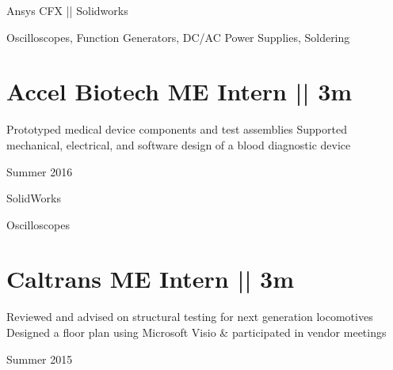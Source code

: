 \vspace{-1.5ex}
{
\vspace{1.8ex}
\color{cyan}\small
{Ansys CFX || Solidworks} %
}

{
\vspace{-2.5ex}\hspace{1.5in}
\color{cyan}\small
{Oscilloscopes, Function Generators, DC/AC Power Supplies, Soldering} %
}

\vspace{3.5ex}
\section
{\textbf{Accel Biotech}
\newline
ME Intern || 3m}

\BulletItem
\vspace{-2.5ex}
\begin{detail}
\BulletItem
Prototyped medical device components and test assemblies
\BulletItem
Supported mechanical, electrical, and software design of a blood diagnostic device
\end{detail}

\begin{subtitle}
\vspace{-7.8ex}
{{Summer 2016}}
\end{subtitle}
\vspace{0ex}

{
\vspace{0.5ex}
\color{cyan}\small
{SolidWorks} %
}

{
\vspace{-2.5ex}\hspace{1.5in}
\color{cyan}\small
{Oscilloscopes} %
}

\vspace{3.5ex}
\section
{\textbf{Caltrans}
\newline
ME Intern || 3m
\newline
}

\BulletItem
\vspace{-2.5ex}
\begin{detail}
\BulletItem
Reviewed and advised on structural testing for next generation locomotives
\BulletItem
Designed a floor plan using {\color{cyan}Microsoft Visio} \& participated in vendor meetings
\end{detail}

\begin{subtitle}
\vspace{-7.8ex}
{{Summer 2015}}
\end{subtitle}

